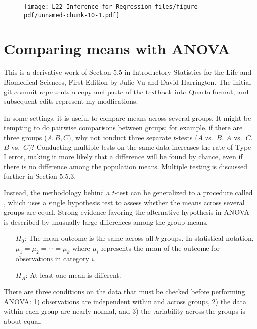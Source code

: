 \documentclass[
  letterpaper,
  DIV=11,
  numbers=noendperiod]{scrreprt}
\begin{document}
\begin{figure}[H]

{\centering \texttt{[image: L22-Inference\_for\_Regression\_files/figure-pdf/unnamed-chunk-10-1.pdf]}

}

\end{figure}

\hypertarget{comparing-means-with-anova}{%
\chapter{Comparing means with ANOVA}\label{comparing-means-with-anova}}

This is a derivative work of Section 5.5 in Introductory Statistics for
the Life and Biomedical Sciences, First Edition by Julie Vu and David
Harrington. The initial git commit represents a copy-and-paste of the
textbook into Quarto format, and subsequent edits represent my
modfications.

In some settings, it is useful to compare means across several groups.
It might be tempting to do pairwise comparisons between groups; for
example, if there are three groups (\(A, B, C\)), why not conduct three
separate \(t\)-tests (\(A\) vs.~\(B\), \(A\) vs.~\(C\), \(B\)
vs.~\(C\))? Conducting multiple tests on the same data increases the
rate of Type I error, making it more likely that a difference will be
found by chance, even if there is no difference among the population
means. Multiple testing is discussed further in Section 5.5.3.

Instead, the methodology behind a \(t\)-test can be generalized to a
procedure called , which uses a
single hypothesis test to assess whether the means across several groups
are equal. Strong evidence favoring the alternative hypothesis in ANOVA
is described by unusually large differences among the group means.

\begin{itemize}
    \setlength{\itemsep}{0mm}
    \item[$H_0$:] The mean outcome is the same across all $k$ groups. In statistical notation, $\mu_1 = \mu_2 = \cdots = \mu_k$ where $\mu_i$ represents the mean of the outcome for observations in category $i$.
    \item[$H_A$:] At least one mean is different.
\end{itemize}

There are three conditions on the data that must be checked before
performing ANOVA: 1) observations are independent within and across
groups, 2) the data within each group are nearly normal, and 3) the
variability across the groups is about equal.
\end{document}
